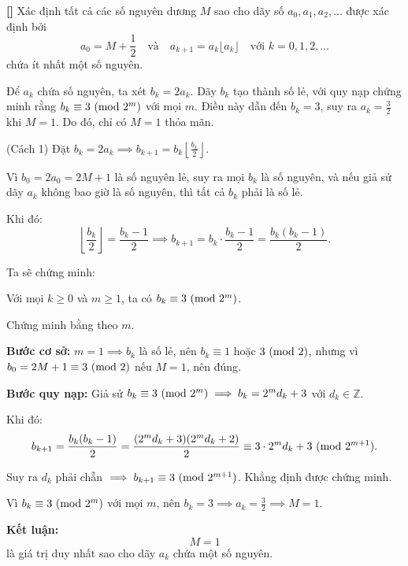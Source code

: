 \documentclass[../05-modular-arithmetic-a.tex]{subfiles}
\begin{document}
\begin{example*}\label{example:IMO-2015-N1}\textbf{[]}
    Xác định tất cả các số nguyên dương \( M \) sao cho dãy số \( a_0, a_1, a_2, \dots \) được xác định bởi  
    \[
        a_0 = M + \frac{1}{2}\quad \text{và}\quad a_{k+1} = a_k \lfloor a_k \rfloor \quad \text{với } k = 0, 1, 2, \dots
    \]
    chứa ít nhất một số nguyên.
\end{example*}

\begin{story*}
    Để \( a_k \) chứa số nguyên, ta xét \( b_k = 2a_k \). Dãy \( b_k \) tạo thành số lẻ, với quy nạp chứng minh rằng \( b_k \equiv 3 \ (\mathrm{mod}\ 2^m) \) với mọi \( m \).  
    Điều này dẫn đến \( b_k = 3 \), suy ra \( a_k = \frac{3}{2} \) khi \( M = 1 \). Do đó, chỉ có \( M = 1 \) thỏa mãn.
\end{story*}

\bigbreak

\begin{soln}(Cách 1)\footnotemark
	Đặt \( b_k = 2a_k \implies b_{k+1} = b_k \left\lfloor \frac{b_k}{2} \right\rfloor \).

	Vì \( b_0 = 2a_0 = 2M + 1 \) là số nguyên lẻ, suy ra mọi \( b_k \) là số nguyên, và nếu giả sử dãy \( a_k \) không bao giờ là số nguyên, thì tất cả \( b_k \) phải là số lẻ.

	Khi đó:
	\[
		\left\lfloor \frac{b_k}{2} \right\rfloor = \frac{b_k - 1}{2}
	\implies b_{k+1} = b_k \cdot \frac{b_k - 1}{2} = \frac{b_k(b_k - 1)}{2}. \tag{1}
	\]

	Ta sẽ chứng minh:
	\begin{claim*}
		Với mọi \( k \ge 0 \) và \( m \ge 1 \), ta có \( b_k \equiv 3 \ (\mathrm{mod}\ 2^m) \).
	\end{claim*}
	\begin{subproof}
		Chứng minh bằng  theo \( m \).

		\textbf{Bước cơ sở:} \( m = 1 \implies b_k \) là số lẻ, nên \( b_k \equiv 1 \) hoặc \( 3 \ (\mathrm{mod}\ 2) \), nhưng vì \( b_0 = 2M + 1 \equiv 3 \ (\mathrm{mod}\ 2) \) nếu \( M = 1 \), nên đúng.

		\textbf{Bước quy nạp:} Giả sử \( b_k \equiv 3 \ (\mathrm{mod}\ 2^m) \implies b_k = 2^m d_k + 3 \) với \( d_k \in \mathbb{Z} \).

		Khi đó:
		\[
			b_{k+1} = \frac{b_k(b_k - 1)}{2} = \frac{(2^m d_k + 3)(2^m d_k + 2)}{2}
			\equiv 3 \cdot 2^m d_k + 3 \ (\mathrm{mod}\ 2^{m+1}).
		\]

		Suy ra \( d_k \) phải chẵn \( \implies b_{k+1} \equiv 3 \ (\mathrm{mod}\ 2^{m+1}) \). Khẳng định được chứng minh.
	\end{subproof}

	Vì \( b_k \equiv 3 \ (\mathrm{mod}\ 2^m) \) với mọi \( m \), nên \( b_k = 3 \implies a_k = \frac{3}{2} \implies M = 1 \).

	\textbf{Kết luận:}
	\[
		\boxed{M = 1}
	\]
	là giá trị duy nhất sao cho dãy \( a_k \) chứa một số nguyên.
\end{soln}

\end{document}
